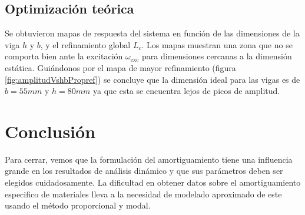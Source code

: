 \documentclass[onecolumn,10pt,titlepage,a4paper]{article}
\begin{document}
\subsection*{Optimización teórica}
Se obtuvieron mapas de respuesta del sistema en función de las dimensiones de la viga $h$ y $b$, y el refinamiento global $L_c$. Los mapas muestran una zona que no se comporta bien ante la excitación $\omega_{\mathrm{exc}}$ para dimensiones cercanas a la dimensión estática. Guiándonos por el mapa de mayor refinamiento (figura \ref{fig:amplitudVshbPropref}) se concluye que la dimensión ideal para las vigas es de $b=55mm$ y $h=80mm$ ya que esta se encuentra lejos de picos de amplitud.

\section{Conclusión}
Para cerrar, vemos que la formulación del amortiguamiento tiene una influencia grande en los resultados de análisis dinámico y que sus parámetros deben ser elegidos cuidadosamente. La dificultad en obtener datos sobre el amortiguamiento especifico de materiales lleva a la necesidad de modelado aproximado de este usando el método proporcional y modal.
\end{document}
